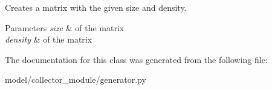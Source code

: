 Creates a matrix with the given size and density. 


\begin{DoxyParams}{Parameters}
{\em size} & of the matrix \\
\hline
{\em density} & of the matrix \\
\hline
\end{DoxyParams}


The documentation for this class was generated from the following file\+:\begin{DoxyCompactItemize}
\item 
model/collector\+\_\+module/generator.\+py\end{DoxyCompactItemize}
